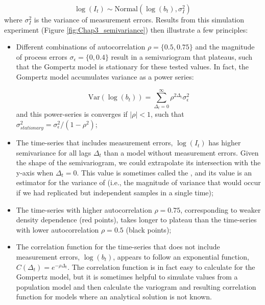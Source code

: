 \begin{equation}
    \log(I_t) \sim \mathrm{Normal} (\log(b_{t}), \sigma_{I}^2)
\end{equation}
where \( \sigma_{I}^2 \) is the variance of measurement errors. 
 Results from this simulation experiment (Figure \ref{fig:Chap3_semivariance}) then illustrate a few principles:
\begin{itemize}
    \item Different combinations of autocorrelation \(\rho=\{0.5,0.75\}\) and the magnitude of process errors \(\sigma_{\epsilon}=\{0,0.4\}\) result in a semivariogram that plateaus, such that the Gompertz model is stationary for these tested values.  In fact, the Gompertz model accumulates variance as a power series:
    
\begin{equation} \label{eq:Chap3_AR1_stationary}
    \mathrm{Var}(\log(b_t)) = \sum_{\Delta_t=0}^{\infty} \rho^{2\Delta_t} \sigma_{\epsilon}^2
\end{equation}
    and this power-series is converges if \(|\rho|<1\), such that \(\sigma_{stationary}^2=\sigma_{\epsilon}^2/(1-\rho^2)\);

    \item The time-series that includes measurement errors, \(\log(I_t)\) has higher semivariance for all lags \( \Delta_t \) than a model without measurement errors.  Given the shape of the semivariogram, we could extrapolate its intersection with the y-axis when \(\Delta_t=0\).  This value is sometimes called the , and its value is an estimator for the variance of  (i.e., the magnitude of variance that would occur if we had replicated but independent samples in a single time);
 
    \item The time-series with higher autocorrelation \(\rho=0.75\), corresponding to weaker density dependence (red points), takes longer to plateau than the time-series with lower autocorrelation \(\rho=0.5\) (black points);

    \item The correlation function for the time-series that does not include measurement errors, \(\log(b_t)\), appears to follow an exponential function, \(C(\Delta_t)=e^{-\rho \Delta_t}\).  The correlation function is in fact easy to calculate for the Gompertz model, but it is sometimes helpful to simulate values from a population model and then calculate the variogram and resulting correlation function for models where an analytical solution is not known.  
\end{itemize}

